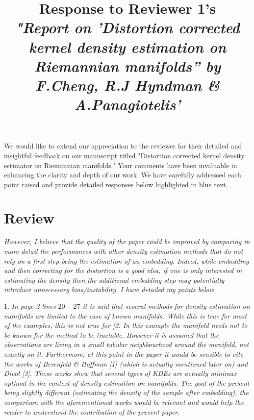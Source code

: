 \documentclass{article}
\date{\vspace{-8ex}}
\begin{document}
\title{Response to Reviewer 1's \\ \textit{"Report on 'Distortion corrected kernel density estimation on Riemannian manifolds” by F.Cheng, R.J Hyndman \& A.Panagiotelis'} }

\maketitle

We would like to extend our appreciation to the reviewer for their detailed and insightful feedback on our manuscript titled "Distortion corrected kernel density estimator on Riemannian manifolds." Your comments have been invaluable in enhancing the clarity and depth of our work. We have carefully addressed each point raised and provide detailed responses below highlighted in blue text.

\section*{Review}

\textit{However, I believe that the quality of the paper could be improved by comparing in more detail the performances with other density estimation methods that do not rely on a first step being the estimation of an embedding. Indeed, while embedding and then correcting for the distortion is a good idea, if one is only interested in estimating the density then the additional embedding step may potentially introduce unnecessary bias/instability. I have detailed my points below.}

1. \textit{In page 2 lines \(20-27\) it is said that several methods for density estimation on manifolds are limited to the case of known manifolds. While this is true for most of the examples, this is not true for [2. In this example the manifold needs not to be known for the method to be tractable. However it is assumed that the observations are living in a small tubular neighbourhood around the manifold, not exactly on it. Furthermore, at this point in the paper it would be sensible to cite the works of Berenfeld \& Hoffman [1] (which is actually mentioned later on) and Divol [3]. These works show that several types of KDEs are actually minimax optimal in the context of density estimation on manifolds. The goal of the present being slightly different (estimating the density of the sample after embedding), the comparison with the aforementioned works would be relevant and would help the reader to understand the contribution of the present paper.}
\end{document}
